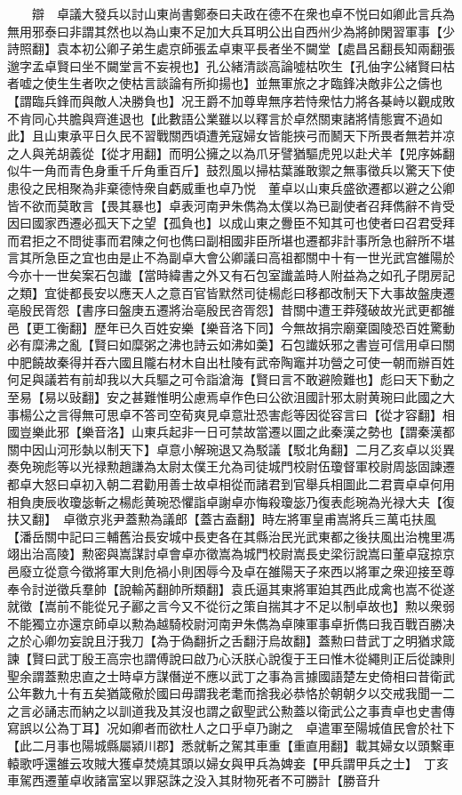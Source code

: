 　　辯　卓議大發兵以討山東尚書鄭泰曰夫政在德不在衆也卓不悦曰如卿此言兵為無用邪泰曰非謂其然也以為山東不足加大兵耳明公出自西州少為將帥閑習軍事【少詩照翻】袁本初公卿子弟生處京師張孟卓東平長者坐不闚堂【處昌呂翻長知兩翻張邈字孟卓賢曰坐不闚堂言不妄視也】孔公緒清談高論噓枯吹生【孔伷字公緒賢曰枯者嘘之使生生者吹之使枯言談論有所抑揚也】並無軍旅之才臨鋒决敵非公之儔也【謂臨兵鋒而與敵人决勝負也】况王爵不加尊卑無序若恃衆怙力將各棊峙以觀成敗不肯同心共膽與齊進退也【此數語公業雖以以釋言於卓然關東諸將情態實不過如此】且山東承平日久民不習戰關西頃遭羌寇婦女皆能挾弓而鬭天下所畏者無若并凉之人與羌胡義從【從才用翻】而明公擁之以為爪牙譬猶驅虎兕以赴犬羊【兕序姊翻似牛一角而青色身重千斤角重百斤】鼓烈風以掃枯葉誰敢禦之無事徵兵以驚天下使患役之民相聚為非棄德恃衆自虧威重也卓乃悦　董卓以山東兵盛欲遷都以避之公卿皆不欲而莫敢言【畏其暴也】卓表河南尹朱儁為太僕以為已副使者召拜儁辭不肯受因曰國家西遷必孤天下之望【孤負也】以成山東之釁臣不知其可也使者曰召君受拜而君拒之不問徙事而君陳之何也儁曰副相國非臣所堪也遷都非計事所急也辭所不堪言其所急臣之宜也由是止不為副卓大會公卿議曰高祖都關中十有一世光武宫雒陽於今亦十一世矣案石包䜟【當時緯書之外又有石包室䜟盖時人附益為之如孔子閉房記之類】宜徙都長安以應天人之意百官皆默然司徒楊彪曰移都改制天下大事故盤庚遷亳殷民胥怨【書序曰盤庚五遷將治亳殷民咨胥怨】昔關中遭王莽殘破故光武更都雒邑【更工衡翻】歷年已久百姓安樂【樂音洛下同】今無故捐宗廟棄園陵恐百姓驚動必有糜沸之亂【賢曰如糜粥之沸也詩云如沸如羮】石包䜟妖邪之書豈可信用卓曰關中肥饒故秦得并吞六國且隴右材木自出杜陵有武帝陶竈并功營之可使一朝而辦百姓何足與議若有前却我以大兵驅之可令詣滄海【賢曰言不敢避險難也】彪曰天下動之至易【易以䜴翻】安之甚難惟明公慮焉卓作色曰公欲沮國計邪太尉黄琬曰此國之大事楊公之言得無可思卓不答司空荀爽見卓意壯恐害彪等因從容言曰【從才容翻】相國豈樂此邪【樂音洛】山東兵起非一日可禁故當遷以圖之此秦漢之勢也【謂秦漢都關中因山河形埶以制天下】卓意小解琬退又為駁議【駁北角翻】二月乙亥卓以災異奏免琬彪等以光禄勲趙謙為太尉太僕王允為司徒城門校尉伍瓊督軍校尉周毖固諫遷都卓大怒曰卓初入朝二君勸用善士故卓相從而諸君到官舉兵相圖此二君賣卓卓何用相負庚辰收瓊毖斬之楊彪黄琬恐懼詣卓謝卓亦悔殺瓊毖乃復表彪琬為光禄大夫【復扶又翻】　卓徵京兆尹蓋勲為議郎【蓋古盍翻】時左將軍皇甫嵩將兵三萬屯扶風【潘岳關中記曰三輔舊治長安城中長吏各在其縣治民光武東都之後扶風出治槐里馮翊出治高陵】勲密與嵩謀討卓會卓亦徵嵩為城門校尉嵩長史梁衍說嵩曰董卓寇掠京邑廢立從意今徵將軍大則危禍小則困辱今及卓在雒陽天子來西以將軍之衆迎接至尊奉令討逆徵兵羣帥【說輸芮翻帥所類翻】袁氏逼其東將軍廹其西此成禽也嵩不從遂就徵【嵩前不能從兄子酈之言今又不從衍之策自揣其才不足以制卓故也】勲以衆弱不能獨立亦還京師卓以勲為越騎校尉河南尹朱儁為卓陳軍事卓折儁曰我百戰百勝决之於心卿勿妄說且汙我刀【為于偽翻折之舌翻汙烏故翻】蓋勲曰昔武丁之明猶求箴諫【賢曰武丁殷王高宗也謂傅說曰啟乃心沃朕心說復于王曰惟木從繩則正后從諫則聖余謂蓋勲忠直之士時卓方謀僭逆不應以武丁之事為言據國語楚左史倚相曰昔衛武公年數九十有五矣猶箴儆於國曰毋謂我老耄而捨我必恭恪於朝朝夕以交戒我聞一二之言必誦志而納之以訓道我及其沒也謂之叡聖武公勲蓋以衛武公之事責卓也史書傳寫誤以公為丁耳】况如卿者而欲杜人之口乎卓乃謝之　卓遣軍至陽城值民會於社下【此二月事也陽城縣屬潁川郡】悉就斬之駕其車重【重直用翻】載其婦女以頭繫車轅歌呼還雒云攻賊大獲卓焚燒其頭以婦女與甲兵為婢妾【甲兵謂甲兵之士】　丁亥車駕西遷董卓收諸富室以罪惡誅之没入其財物死者不可勝計【勝音升
